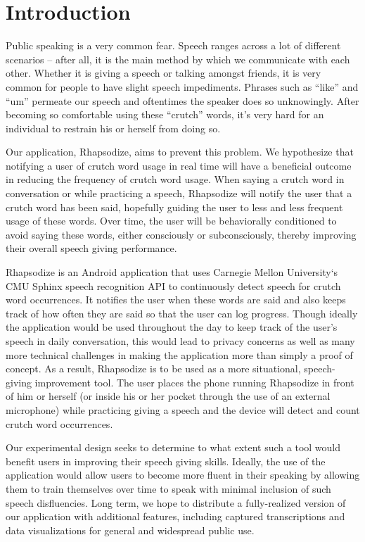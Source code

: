 \documentclass{sigchi}
\begin{document}

\section{Introduction}

Public speaking is a very common fear. Speech ranges across a lot of different scenarios -- after all, it is the main method by which we communicate with each other. Whether it is giving a speech or talking amongst friends, it is very common for people to have slight speech impediments. Phrases such as ``like'' and ``um'' permeate our speech and oftentimes the speaker does so unknowingly. After becoming so comfortable using these “crutch” words, it’s very hard for an individual to restrain his or herself from doing so.

Our application, Rhapsodize, aims to prevent this problem. We hypothesize that notifying a user of crutch word usage in real time will have a beneficial outcome in reducing the frequency of crutch word usage. When saying a crutch word in conversation or while practicing a speech, Rhapsodize will notify the user that a crutch word has been said, hopefully guiding the user to less and less frequent usage of these words. Over time, the user will be behaviorally conditioned to avoid saying these words, either consciously or subconsciously, thereby improving their overall speech giving performance.

Rhapsodize is an Android application that uses Carnegie Mellon University`s CMU Sphinx speech recognition API to continuously detect speech for crutch word occurrences. It notifies the user when these words are said and also keeps track of how often they are said so that the user can log progress. Though ideally the application would be used throughout the day to keep track of the user’s speech in daily conversation, this would lead to privacy concerns as well as many more technical challenges in making the application more than simply a proof of concept. As a result, Rhapsodize is to be used as a more situational, speech-giving improvement tool. The user places the phone running Rhapsodize in front of him or herself (or inside his or her pocket through the use of an external microphone) while practicing giving a speech and the device will detect and count crutch word occurrences. 

Our experimental design seeks to determine to what extent such a tool would benefit users in improving their speech giving skills. Ideally, the use of the application would allow users to become more fluent in their speaking by allowing them to train themselves over time to speak with minimal inclusion of such speech disfluencies. Long term, we hope to distribute a fully-realized version of our application with additional features, including captured transcriptions and data visualizations for general and widespread public use.
\end{document}
